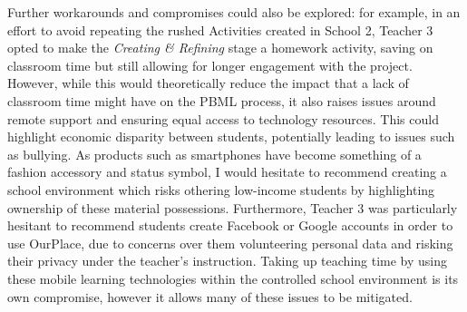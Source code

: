 Further workarounds and compromises could also be explored: for example, in an effort to avoid repeating the rushed Activities created in School 2, Teacher 3 opted to make the \textit{Creating \& Refining} stage a homework activity, saving on classroom time but still allowing for longer engagement with the project. However, while this would theoretically reduce the impact that a lack of classroom time might have on the PBML process, it also raises issues around remote support and ensuring equal access to technology resources. This could highlight economic disparity between students, potentially leading to issues such as bullying. As products such as smartphones have become something of a fashion accessory and status symbol, I would hesitate to recommend creating a school environment which risks othering low-income students by highlighting ownership of these material possessions. Furthermore, Teacher 3 was particularly hesitant to recommend students create Facebook or Google accounts in order to use OurPlace, due to concerns over them volunteering personal data and risking their privacy under the teacher's instruction. Taking up teaching time by using these mobile learning technologies within the controlled school environment is its own compromise, however it allows many of these issues to be mitigated.

